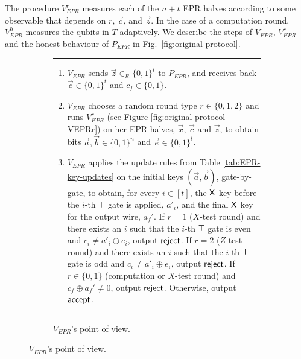 \documentclass[11pt]{article}
\begin{document}
The procedure $V_{EPR}^r$ measures each of the $n+t$ EPR halves according to
some observable that depends on $r$, $\vec{c}$, and $\vec{z}$. In the case of a
computation round, $V_{EPR}^0$ measures the qubits in $T$ adaptively.  We
describe the steps of $V_{EPR}$, $V_{EPR}^r$ and the honest behaviour of
$P_{EPR}$ in Fig.~\ref{fig:original-protocol}.


\begin{figure}[H]
  \begin{subfigure}{\textwidth}
\rule[1ex]{\textwidth}{0.5pt}
\begin{enumerate}
\item $V_{EPR}$ sends $\vec{z}\in_R\{0,1\}^t$ to $P_{EPR}$,
and receives back $\vec{c}\in\{0,1\}^t$ and $c_f\in\{0,1\}$.
\item $V_{EPR}$ chooses a random round type $r\in\{0,1,2\}$ and runs $V_{EPR}^r$ (see Figure \ref{fig:original-protocol-VEPRr}) on her EPR halves, $\vec{x}$, $\vec{c}$ and $\vec{z}$, to obtain bits $\vec{a},\vec{b}\in\{0,1\}^n$ and $\vec{e}\in\{0,1\}^t$. 
\item $V_{EPR}$ applies the update rules from Table \ref{tab:EPR-key-updates} on the initial keys $(\vec{a},\vec{b})$, gate-by-gate, to obtain, for every $i\in [t]$, the $\sf X$-key before the $i$-th $\sf T$ gate is applied, $a'_i$, and the final $\sf X$ key for the output wire, $a_f'$. If $r=1$ ($X$-test round) and there exists an $i$ such that the $i$-th $\sf T$ gate is even and $c_i\neq a'_i\oplus e_i$, output $\sf reject$. If $r=2$ ($Z$-test round) and there exists an $i$ such that the $i$-th $\sf T$ gate is odd and $c_i\neq a'_i\oplus e_i$, output $\sf reject$. If $r\in\{0,1\}$ (computation or $X$-test round) and $c_f\oplus a_f'\neq 0$, output $\sf reject$. Otherwise, output $\sf accept$. 
\end{enumerate}
\rule[2ex]{\textwidth}{0.5pt}\vspace{-.5cm}
    \caption{ $V_{EPR}$'s point of view.}
  \label{fig:original-protocol-VEPR}
    \end{subfigure}


\end{figure}
\end{document}
